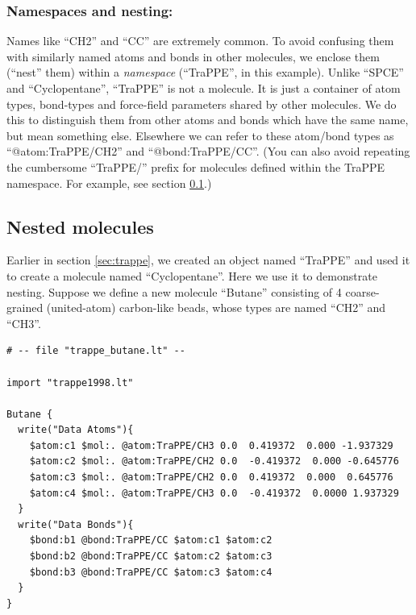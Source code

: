 \documentclass[11pt]{article}
\begin{document}
\subsubsection*{Namespaces and nesting:}
Names like ``CH2'' and ``CC'' are extremely common.
To avoid confusing them with similarly named atoms and bonds 
in other molecules, we enclose them (``nest'' them) within a 
\textit{namespace} (``TraPPE'', in this example).
Unlike ``SPCE'' and ``Cyclopentane'', ``TraPPE'' is not a molecule.
It is just a container of atom types, bond-types and 
force-field parameters shared by other molecules.
We do this to distinguish them from other atoms and bonds 
which have the same name, but mean something else.
Elsewhere we can refer to these atom/bond types as
``@atom:TraPPE/CH2'' and ``@bond:TraPPE/CC''.
(You can also avoid repeating the cumbersome ``TraPPE/'' prefix 
 for molecules defined within the TraPPE namespace.
 For example, see section \ref{sec:butane}.)





\subsection{Nested molecules}
\label{sec:butane}
Earlier in section \ref{sec:trappe}, we created an object named ``TraPPE''
and used it to create a molecule named ``Cyclopentane''.
Here we use it to demonstrate nesting.
Suppose we define a new molecule ``Butane'' consisting of 4 coarse-grained
(united-atom) carbon-like beads, whose types are named ``CH2'' and ``CH3''.
\begin{verbatim}
# -- file "trappe_butane.lt" --

import "trappe1998.lt"

Butane {
  write("Data Atoms"){
    $atom:c1 $mol:. @atom:TraPPE/CH3 0.0  0.419372  0.000 -1.937329
    $atom:c2 $mol:. @atom:TraPPE/CH2 0.0  -0.419372  0.000 -0.645776
    $atom:c3 $mol:. @atom:TraPPE/CH2 0.0  0.419372  0.000  0.645776
    $atom:c4 $mol:. @atom:TraPPE/CH3 0.0  -0.419372  0.0000 1.937329
  }
  write("Data Bonds"){
    $bond:b1 @bond:TraPPE/CC $atom:c1 $atom:c2
    $bond:b2 @bond:TraPPE/CC $atom:c2 $atom:c3
    $bond:b3 @bond:TraPPE/CC $atom:c3 $atom:c4
  }
}
\end{verbatim}
\end{document}
